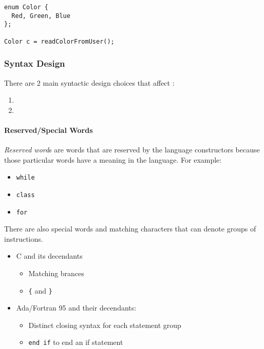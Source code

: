 \begin{verbatim}
enum Color {
  Red, Green, Blue
};

Color c = readColorFromUser();
\end{verbatim}

\subsubsection{Syntax Design}\label{subsubsec:Syntax_Design}
There are 2 main syntactic design choices that affect :
\begin{enumerate}[noitemsep]
\item {}
\item {}
\end{enumerate}

\paragraph{Reserved/Special Words}\label{par:Reserved_Words}
\begin{definition}\label{def:Reserved_Word}
  \emph{Reserved word}s are words that are reserved by the language constructors because those particular words have a meaning in the language.
  For example:
  \begin{itemize}[noitemsep]
  \item \texttt{while}
  \item \texttt{class}
  \item \texttt{for}
  \end{itemize}
\end{definition}

There are also special words and matching characters that can denote groups of instructions.
\begin{itemize}[noitemsep]
\item C and its decendants
  \begin{itemize}[noitemsep]
  \item Matching brances
  \item \texttt{\{} and \texttt{\}}
  \end{itemize}
\item Ada/Fortran 95 and their decendants:
  \begin{itemize}[noitemsep]
  \item Distinct closing syntax for each statement group
  \item \texttt{end if} to end an if statement
  \end{itemize}
\end{itemize}

